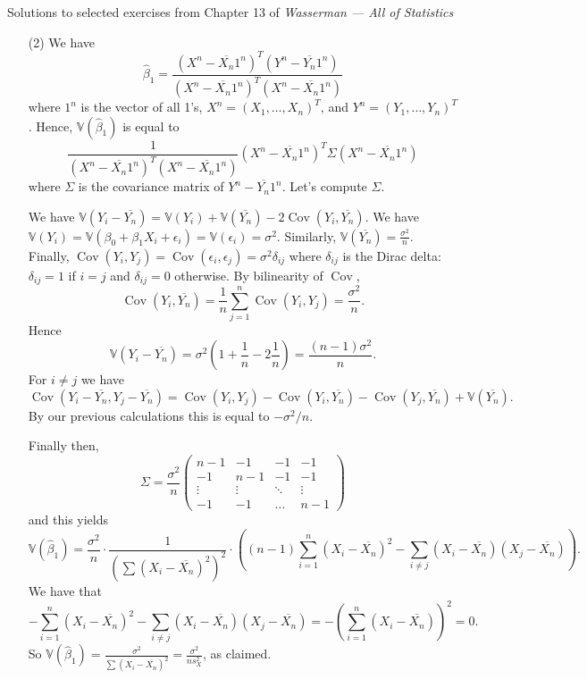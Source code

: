 \documentclass[10pt]{article}
\newcommand{\V}{\mathbb{V}}
\newcommand{\Cov}{\operatorname{Cov}}
\begin{document}
\noindent \large{Solutions to selected exercises from Chapter 13 of
\emph{Wasserman --- All of Statistics}}

\begin{enumerate}

\item[(2)]
We have
\[
\hat \beta_1 = \frac{(X^n - \overline{X_n}1^n)^T
(Y^n - \overline{Y_n}1^n)}{(X^n - \overline{X_n}1^n)^T
(X^n - \overline{X_n}1^n)}
\]
where $1^n$ is the vector of all 1's, $X^n=(X_1,\ldots,X_n)^T$,
and $Y^n=(Y_1,\ldots,Y_n)^T$. Hence, $\V(\hat \beta_1)$ is equal to
\[
\frac{1}{(X^n - \overline{X_n}1^n)^T
(X^n - \overline{X_n}1^n)}
(X^n - \overline{X_n}1^n)^T \Sigma (X^n - \overline{X_n}1^n)
\]
where $\Sigma$ is the covariance matrix of $Y^n - \overline{Y_n} 1^n$.
Let's compute $\Sigma$.

We have $\V(Y_i - \overline{Y_n})=
\V(Y_i) + \V(\overline{Y_n}) - 2\Cov(Y_i,\overline{Y_n})$.
We have $\V(Y_i)=\V(\beta_0+\beta_1X_i+\epsilon_i)=\V(\epsilon_i)=\sigma^2$.
Similarly, $\V(\overline{Y_n})=\frac{\sigma^2}{n}$. Finally,
$\Cov(Y_i,Y_j)=\Cov(\epsilon_i,\epsilon_j)=\sigma^2 \delta_{ij}$
where $\delta_{ij}$ is the Dirac delta: $\delta_{ij}=1$ if $i=j$ and
$\delta_{ij}=0$ otherwise.
By bilinearity of $\Cov$,
\[
\Cov(Y_i,\overline{Y_n}) = \frac{1}{n} \sum_{j=1}^n \Cov(Y_i,Y_j)=\frac{\sigma^2}{n}.
\]
Hence
\[
\V(Y_i-\overline{Y_n}) = \sigma^2\left(1+\frac{1}{n} - 2\frac{1}{n}\right) =
\frac{(n-1)\sigma^2}{n}.
\]
For $i\neq j$ we have
\[
\Cov(Y_i - \overline{Y_n}, Y_j - \overline{Y_n}) =
\Cov(Y_i, Y_j) - \Cov(Y_i, \overline{Y_n}) - \Cov(Y_j, \overline{Y_n}) +
\V(\overline{Y_n}).
\]
By our previous calculations this is equal to $-\sigma^2/n$.

Finally then,
\[
\Sigma = \frac{\sigma^2}{n}\begin{pmatrix}
n-1 & -1 & -1 & -1 \\
-1 & n-1 & -1 & -1 \\
\vdots & \vdots  & \ddots & \vdots \\
-1 & -1 & \ldots & n-1
\end{pmatrix}
\]
and this yields
\[
\V(\hat \beta_1) = \frac{\sigma^2}{n} \cdot
\frac{1}{\left(\sum (X_i - \overline{X_n})^2\right)^2} \cdot
\left((n-1)\sum_{i=1}^n (X_i - \overline{X_n})^2 - \sum_{i\neq j}
(X_i-\overline{X_n})(X_j-\overline{X_n})\right).
\]
We have that
\[
-\sum_{i=1}^n (X_i - \overline{X_n})^2 -
\sum_{i\neq j}(X_i-\overline{X_n})(X_j-\overline{X_n}) =
- \left(\sum_{i=1}^n (X_i-\overline{X_n})\right)^2 = 0.
\]
So
$\V(\hat \beta_1)=\frac{\sigma^2}{\sum (X_i-\overline{X_n})^2}=\frac{\sigma^2}{ns_X^2}$,
as claimed.


\end{enumerate}
\end{document}
